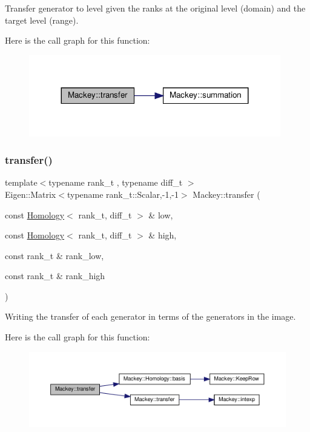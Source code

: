 Transfer generator to level given the ranks at the original level (domain) and the target level (range). 

Here is the call graph for this function\+:\nopagebreak
\begin{figure}[H]
\begin{center}
\leavevmode
\includegraphics[width=311pt]{namespaceMackey_a0550bf97e47b3c319cb5e1bd81008d89_cgraph}
\end{center}
\end{figure}
\mbox{\label{namespaceMackey_a3f20cf0ccf7d280f6a6e308c381dc350}} 
\subsubsection{\texorpdfstring{transfer()}{transfer()}\hspace{0.1cm}{\footnotesize\ttfamily [6/6]}}
{\footnotesize\ttfamily template$<$typename rank\+\_\+t , typename diff\+\_\+t $>$ \\
Eigen\+::\+Matrix$<$typename rank\+\_\+t\+::\+Scalar,-\/1,-\/1$>$ Mackey\+::transfer (\begin{DoxyParamCaption}\item[{const \hyperlink{classMackey_1_1Homology}{Homology}$<$ rank\+\_\+t, diff\+\_\+t $>$ \&}]{low,  }\item[{const \hyperlink{classMackey_1_1Homology}{Homology}$<$ rank\+\_\+t, diff\+\_\+t $>$ \&}]{high,  }\item[{const rank\+\_\+t \&}]{rank\+\_\+low,  }\item[{const rank\+\_\+t \&}]{rank\+\_\+high }\end{DoxyParamCaption})}



Writing the transfer of each generator in terms of the generators in the image. 

Here is the call graph for this function\+:\nopagebreak
\begin{figure}[H]
\begin{center}
\leavevmode
\includegraphics[width=350pt]{namespaceMackey_a3f20cf0ccf7d280f6a6e308c381dc350_cgraph}
\end{center}
\end{figure}


